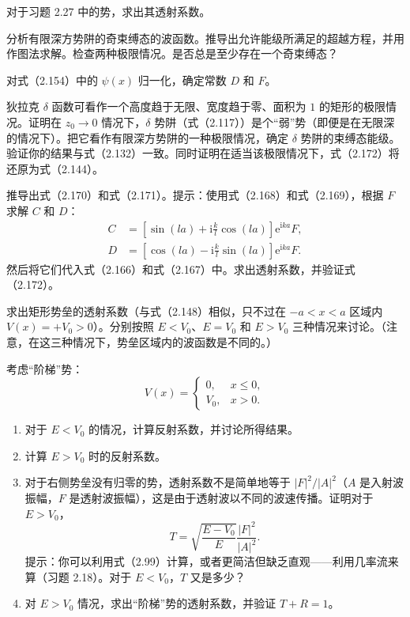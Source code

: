 对于习题 2.27 中的势，求出其透射系数。
\vfill

分析有限深方势阱的奇束缚态的波函数。推导出允许能级所满足的超越方程，并用作图法求解。检查两种极限情况。是否总是至少存在一个奇束缚态？
\vfill

对式（2.154）中的 $\psi(x)$ 归一化，确定常数 $D$ 和 $F$。
\vfill

狄拉克 $\delta$ 函数可看作一个高度趋于无限、宽度趋于零、面积为 $1$ 的矩形的极限情况。证明在 $z_0\to0$ 情况下，$\delta$ 势阱（式（2.117））是个“弱”势（即便是在无限深的情况下）。把它看作有限深方势阱的一种极限情况，确定 $\delta$ 势阱的束缚态能级。验证你的结果与式（2.132）一致。同时证明在适当该极限情况下，式（2.172）将还原为式（2.144）。
\vfill

推导出式（2.170）和式（2.171）。提示：使用式（2.168）和式（2.169），根据 $F$ 求解 $C$ 和 $D$：
\begin{align*}
C&=\left[\sin(la)+\mathrm{i}\frac{k}{l}\cos(la)\right]\mathrm{e}^{\mathrm{i}ka}F,\\
D&=\left[\cos(la)-\mathrm{i}\frac{k}{l}\sin(la)\right]\mathrm{e}^{\mathrm{i}ka}F.
\end{align*}
然后将它们代入式（2.166）和式（2.167）中。求出透射系数，并验证式（2.172）。
\vfill

求出矩形势垒的透射系数（与式（2.148）相似，只不过在 $-a<x<a$ 区域内 $V(x)=+V_0>0$）。分别按照 $E<V_0$、$E=V_0$ 和 $E>V_0$ 三种情况来讨论。（注意，在这三种情况下，势垒区域内的波函数是不同的。）
\vfill

考虑“阶梯”势：
\[
V(x)=\begin{cases}0,&x\leq0,\\V_0,&x>0.\end{cases}
\]
\begin{enumerate}
\item 对于 $E<V_0$ 的情况，计算反射系数，并讨论所得结果。
\item 计算 $E>V_0$ 时的反射系数。
\item 对于右侧势垒没有归零的势，透射系数不是简单地等于 $|F|^2/|A|^2$（$A$ 是入射波振幅，$F$ 是透射波振幅），这是由于透射波以不同的波速传播。证明对于 $E>V_0$，
\[
T=\sqrt{\frac{E-V_0}{E}}\frac{|F|^2}{|A|^2}.
\]
提示：你可以利用式（2.99）计算，或者更简洁但缺乏直观——利用几率流来算（习题 2.18）。对于 $E<V_0$，$T$ 又是多少？
\item 对 $E>V_0$ 情况，求出“阶梯”势的透射系数，并验证 $T+R=1$。
\end{enumerate}
\vfill

